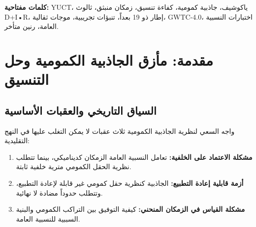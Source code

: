 \documentclass[11pt,a4paper]{article}
\theoremstyle{remark}
\begin{document}
\begin{titlepage}
\begin{center}
\begin{abstract}
				\noindent
				\textbf{جديد في هذا الإصدار:} نقدم أول اختبار شامل لـ YUCT باستخدام بيانات الموجات الثقالية من كتالوج GWTC-4.0 لتعاون LIGO-Virgo-KAGRA. بتحليل جميع أحداث اندماج الأجرام الثنائية المتراصة البالغ عددها 218، نجد اتجاهاً معتمداً على الكتلة في انحرافات الرنين المتأخر متسقاً مع تنبؤ YUCT بأن تأثيرات التنسيق تتدرج مع حجم النظام. في فئة الكتلة العالية ($M > 60 M_\odot$)، يُظهر معامل الانحراف المستنتج $\alpha_{\text{YUCT}} = (2.1 \pm 1.0) \times 10^{-3}$ أفضلية بقيمة $2.1\sigma$ لقيمة غير صفرية، محولاً YUCT من إطار تفسيري بحت إلى نظرية مختبرة كمياً ذات قدرة تنبؤية. يحل هذا الملحق محل جميع الإصدارات السابقة ويدمج الشكلية الرياضية الكاملة مع التحقق التجريبي.
			\end{abstract}
			
			\vspace{0cm}
			
			\noindent
			\textbf{كلمات مفتاحية:} YUCT، ياكوشيف، جاذبية كمومية، كفاءة تنسيق، زمكان منبثق، ثالوث D+I•R، إطار ذو 19 بعداً، تنبؤات تجريبية، موجات ثقالية، GWTC-4.0، اختبارات النسبية العامة، رنين متأخر.
			
			\vspace{0.5cm}
			
		\end{center}
	\end{titlepage}
	
	\tableofcontents
	\newpage
	
	\section{مقدمة: مأزق الجاذبية الكمومية وحل التنسيق}
	\label{sec:introduction}
	
	\subsection{السياق التاريخي والعقبات الأساسية}
	
	واجه السعي لنظرية الجاذبية الكمومية ثلاث عقبات لا يمكن التغلب عليها في النهج التقليدية:
	
	\begin{enumerate}
		\item \textbf{مشكلة الاعتماد على الخلفية:} تعامل النسبية العامة الزمكان كديناميكي، بينما تتطلب نظرية الحقل الكمومي مترية خلفية ثابتة.
		
		\item \textbf{أزمة قابلية إعادة التطبيع:} الجاذبية كنظرية حقل كمومي غير قابلة لإعادة التطبيع، وتتطلب حدوداً مضادة لا نهائية.
		
		\item \textbf{مشكلة القياس في الزمكان المنحني:} كيفية التوفيق بين التراكب الكمومي والبنية السببية للنسبية العامة.
	\end{enumerate}
	
\end{document}
